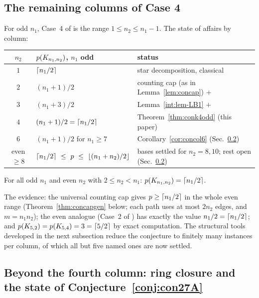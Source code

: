 \subsection{The remaining columns of Case 4}\label{subsec:columns}

For odd $n_1$, Case~4 of \cite{CE18} is the range $1\le n_2\le n_1-1$. The
state of affairs by column:
\begin{center}\small
\begin{tabular}{c l l}
\hline
$n_2$ & $p(K_{n_1,n_2})$, $n_1$ odd & status \\
\hline
$1$ & $\left\lceil n_1/2 \right\rceil$ & star decomposition, classical\\
$2$ & $(n_1+1)/2$ & counting cap (as in Lemma~\ref{lem:concap}) $+$ \cite{Pyb96}\\
$3$ & $(n_1+3)/2$ & Lemma~\ref{int:lem-LB1} $+$ \cite{Pyb96}\\
$4$ & $(n_1+1)/2=\left\lceil n_1/2 \right\rceil$ & Theorem~\ref{thm:conk4odd} (this paper)\\
$6$ & $(n_1+1)/2$ for $n_1\ge7$ & Corollary~\ref{cor:concol6}
(Sec.~\ref{subsec:ring})\\
even $\ge8$ & $\ceil{n_1/2}\ \le\ \pn\ \le\ \floor{(n_1+n_2)/2}$ & bases
settled for $n_2=8,10$; rest open (Sec.~\ref{subsec:ring})\\
\hline
\end{tabular}
\end{center}

\begin{conjecture}\label{conj:con27A}
For all odd $n_1$ and even $n_2$ with $2\le n_2<n_1$:
$p(K_{n_1,n_2})=\left\lceil n_1/2 \right\rceil$.
\end{conjecture}

The evidence: the universal counting cap gives $p\ge\left\lceil n_1/2 \right\rceil$ in the
whole even range (Theorem~\ref{thm:concapgen} below; each path uses at
most $2n_2$ edges, and $m=n_1n_2$); the even analogue (Case~2 of
\cite{CE18}) has exactly the value $n_1/2=\left\lceil n_1/2 \right\rceil$; and
$p(K_{5,2})=p(K_{5,4})=3=\left\lceil 5/2 \right\rceil$ by exact computation. The
structural tools developed in the next subsection reduce the conjecture to
finitely many instances per column, of which all but five named ones are
now settled.

\subsection{Beyond the fourth column: ring closure and the state of
Conjecture~\ref{conj:con27A}}\label{subsec:ring}

